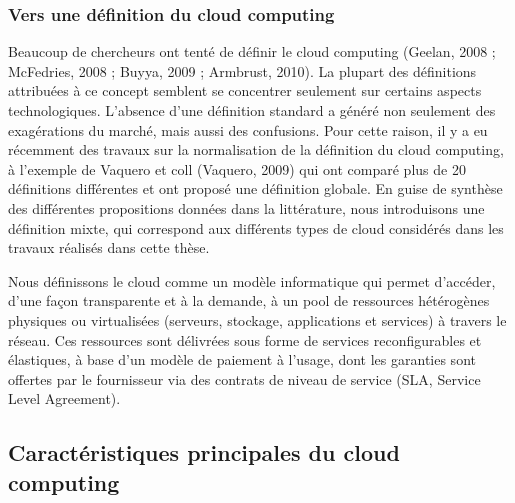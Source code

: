 \subsubsection{Vers une définition du cloud computing }
Beaucoup de chercheurs ont tenté de définir le cloud computing (Geelan, 2008 ; McFedries, 2008 ; Buyya, 2009 ; Armbrust, 2010). La plupart des définitions attribuées à ce concept semblent se concentrer seulement sur certains aspects technologiques. L'absence d'une définition standard a généré non seulement des exagérations du marché, mais aussi des confusions. Pour cette raison, il y a eu récemment des travaux sur la normalisation de la définition du cloud computing, à l'exemple de Vaquero et coll (Vaquero, 2009) qui ont comparé plus de 20 définitions différentes et ont proposé une définition globale.  En guise de synthèse des différentes propositions données dans la littérature, nous introduisons une définition mixte, qui correspond aux différents types de cloud considérés dans les travaux réalisés dans cette thèse.

\begin{defn}
   Nous définissons le cloud comme un modèle informatique qui permet d’accéder, d’une façon transparente et à la demande, à un pool de ressources hétérogènes physiques ou virtualisées (serveurs, stockage, applications et services) à travers le réseau. Ces ressources sont délivrées sous forme de services reconfigurables et élastiques, à base d’un modèle de paiement à l’usage, dont les garanties sont offertes par le fournisseur via des contrats de niveau de service (SLA, Service Level Agreement). 
\end{defn}
%
%    
%
    \subsection{Caractéristiques principales du cloud computing}
% 
